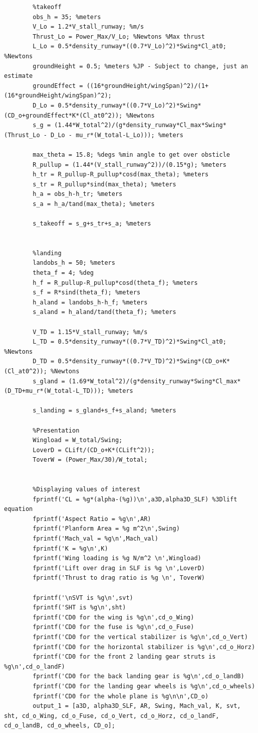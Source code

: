 \documentclass[12pt,A4paper]{article}
\begin{document}
\begin{lstlisting}
		%takeoff
		obs_h = 35; %meters
		V_Lo = 1.2*V_stall_runway; %m/s
		Thrust_Lo = Power_Max/V_Lo; %Newtons %Max thrust
		L_Lo = 0.5*density_runway*((0.7*V_Lo)^2)*Swing*Cl_at0; %Newtons 
		groundHeight = 0.5; %meters %JP - Subject to change, just an estimate
		groundEffect = ((16*groundHeight/wingSpan)^2)/(1+(16*groundHeight/wingSpan)^2);
		D_Lo = 0.5*density_runway*((0.7*V_Lo)^2)*Swing*(CD_o+groundEffect*K*(Cl_at0^2)); %Newtons
		s_g = (1.44*W_total^2)/(g*density_runway*Cl_max*Swing*(Thrust_Lo - D_Lo - mu_r*(W_total-L_Lo))); %meters
		
		max_theta = 15.8; %degs %min angle to get over obsticle
		R_pullup = (1.44*(V_stall_runway^2))/(0.15*g); %meters
		h_tr = R_pullup-R_pullup*cosd(max_theta); %meters
		s_tr = R_pullup*sind(max_theta); %meters
		h_a = obs_h-h_tr; %meters
		s_a = h_a/tand(max_theta); %meters
		
		s_takeoff = s_g+s_tr+s_a; %meters
		
		
		%landing
		landobs_h = 50; %meters
		theta_f = 4; %deg
		h_f = R_pullup-R_pullup*cosd(theta_f); %meters
		s_f = R*sind(theta_f); %meters
		h_aland = landobs_h-h_f; %meters
		s_aland = h_aland/tand(theta_f); %meters
		
		V_TD = 1.15*V_stall_runway; %m/s 
		L_TD = 0.5*density_runway*((0.7*V_TD)^2)*Swing*Cl_at0; %Newtons
		D_TD = 0.5*density_runway*((0.7*V_TD)^2)*Swing*(CD_o+K*(Cl_at0^2)); %Newtons
		s_gland = (1.69*W_total^2)/(g*density_runway*Swing*Cl_max*(D_TD+mu_r*(W_total-L_TD))); %meters
		
		s_landing = s_gland+s_f+s_aland; %meters
		
		%Presentation
		Wingload = W_total/Swing;
		LoverD = CLift/(CD_o+K*(CLift^2));
		ToverW = (Power_Max/30)/W_total;
		
		
		%Displaying values of interest
		fprintf('CL = %g*(alpha-(%g))\n',a3D,alpha3D_SLF) %3Dlift equation
		fprintf('Aspect Ratio = %g\n',AR)
		fprintf('Planform Area = %g m^2\n',Swing)
		fprintf('Mach_val = %g\n',Mach_val)
		fprintf('K = %g\n',K)
		fprintf('Wing loading is %g N/m^2 \n',Wingload)
		fprintf('Lift over drag in SLF is %g \n',LoverD)
		fprintf('Thrust to drag ratio is %g \n', ToverW)
		
		fprintf('\nSVT is %g\n',svt)
		fprintf('SHT is %g\n',sht)
		fprintf('CD0 for the wing is %g\n',cd_o_Wing)
		fprintf('CD0 for the fuse is %g\n',cd_o_Fuse)
		fprintf('CD0 for the vertical stabilizer is %g\n',cd_o_Vert)
		fprintf('CD0 for the horizontal stabilizer is %g\n',cd_o_Horz)
		fprintf('CD0 for the front 2 landing gear struts is %g\n',cd_o_landF)
		fprintf('CD0 for the back landing gear is %g\n',cd_o_landB)
		fprintf('CD0 for the landing gear wheels is %g\n',cd_o_wheels)
		fprintf('CD0 for the whole plane is %g\n\n',CD_o)
		output_1 = [a3D, alpha3D_SLF, AR, Swing, Mach_val, K, svt, sht, cd_o_Wing, cd_o_Fuse, cd_o_Vert, cd_o_Horz, cd_o_landF, cd_o_landB, cd_o_wheels, CD_o];
		

\end{lstlisting}
\end{document}
